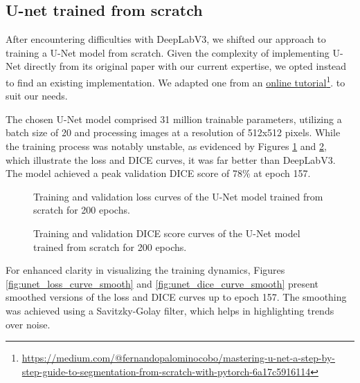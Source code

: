 \subsection{U-net trained from scratch}
After encountering difficulties with DeepLabV3, we shifted our approach to training a U-Net model from scratch. 
Given the complexity of implementing U-Net directly from its original paper with our current expertise, we opted 
instead to find an existing implementation. We adapted one from an \href{https://medium.com/@fernandopalominocobo/mastering-u-net-a-step-by-step-guide-to-segmentation-from-scratch-with-pytorch-6a17c5916114}{online tutorial}\footnote{\url{https://medium.com/@fernandopalominocobo/mastering-u-net-a-step-by-step-guide-to-segmentation-from-scratch-with-pytorch-6a17c5916114}}.
to suit our needs. 

The chosen U-Net model comprised 31 million trainable parameters, utilizing a batch size of 20 and processing 
images at a resolution of 512x512 pixels. While the training process was notably unstable, as evidenced by Figures 
\ref{fig:unet_loss_curve} and \ref{fig:unet_dice_curve}, which illustrate the loss and DICE curves, it was far 
better than DeepLabV3. The model achieved a peak validation DICE score of 78\% at epoch 157. 

\begin{figure}[ht]
    \centering
    \caption{Training and validation loss curves of the U-Net model trained from scratch for 200 epochs.}
    \label{fig:unet_loss_curve}
\end{figure}

\begin{figure}[ht]
    \centering
    \caption{Training and validation DICE score curves of the U-Net model trained from scratch for 200 epochs.}
    \label{fig:unet_dice_curve}
\end{figure}


For enhanced clarity in visualizing the training dynamics, Figures \ref{fig:unet_loss_curve_smooth} and 
\ref{fig:unet_dice_curve_smooth} present smoothed versions of the loss and DICE curves up to epoch 157. 
The smoothing was achieved using a Savitzky-Golay filter, which helps in highlighting trends over noise. 


